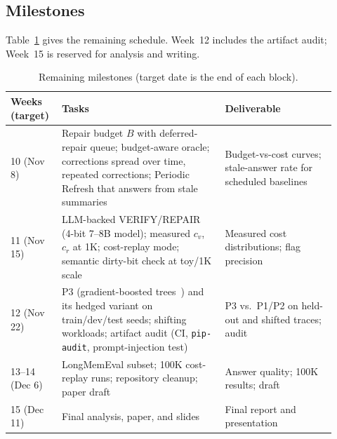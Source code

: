 \documentclass{article}
\begin{document}
\subsection{Milestones}
Table~\ref{tab:milestones} gives the remaining schedule. Week~12 includes the
artifact audit; Week~15 is reserved for analysis and writing.

\begin{table}[h]
\centering
\small
\caption{Remaining milestones (target date is the end of each block).}
\label{tab:milestones}
\begin{tabular}{@{}p{0.13\linewidth}p{0.47\linewidth}p{0.32\linewidth}@{}}
\toprule
Weeks (target) & Tasks & Deliverable \\
\midrule
10 (Nov 8) & Repair budget $B$ with deferred-repair queue; budget-aware oracle; corrections spread over time, repeated corrections; Periodic Refresh that answers from stale summaries & Budget-vs-cost curves; stale-answer rate for scheduled baselines \\
11 (Nov 15) & LLM-backed VERIFY/REPAIR (4-bit 7--8B model); measured $c_v$, $c_r$ at 1K; cost-replay mode; semantic dirty-bit check at toy/1K scale & Measured cost distributions; flag precision \\
12 (Nov 22) & P3 (gradient-boosted trees~\citep{chen2016xgboost}) and its hedged variant on train/dev/test seeds; shifting workloads; artifact audit (CI, \texttt{pip-audit}, prompt-injection test) & P3 vs.\ P1/P2 on held-out and shifted traces; audit \\
13--14 (Dec 6) & LongMemEval subset; 100K cost-replay runs; repository cleanup; paper draft & Answer quality; 100K results; draft \\
15 (Dec 11) & Final analysis, paper, and slides & Final report and presentation \\
\bottomrule
\end{tabular}
\end{table}



\end{document}
